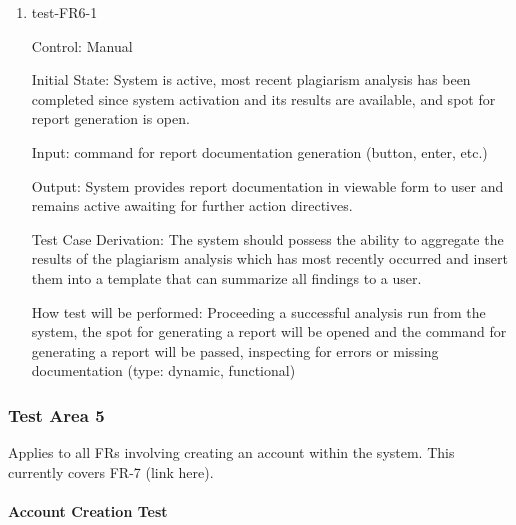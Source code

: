 \documentclass[12pt, titlepage]{article}
\begin{document}
\begin{enumerate}

\item{test-FR6-1\\}

Control: Manual
					
Initial State: System is active, most recent plagiarism analysis has been 
completed since system activation and its results are available, and spot 
for report generation is open.
					
Input: command for report documentation generation (button, enter, etc.)
					
Output: System provides report documentation in viewable form to user and 
remains active awaiting for further action directives.

Test Case Derivation: The system should possess the ability to aggregate
the results of the plagiarism analysis which has most recently occurred 
and insert them into a template that can summarize all findings to a user.

How test will be performed: Proceeding a successful analysis run from the system,
the spot for generating a report will be opened and the command for generating 
a report will be passed, inspecting for errors or missing documentation (type:
dynamic, functional)			

\end{enumerate}

\subsubsection{Test Area 5}

Applies to all FRs involving creating an account within the system. This currently
covers FR-7 (link here).

\paragraph{Account Creation Test}
\end{document}
